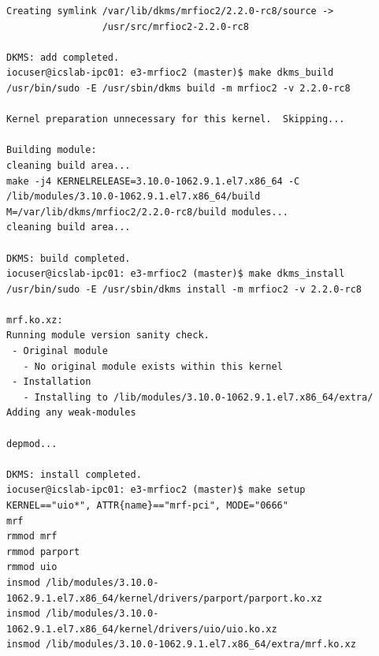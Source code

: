 \documentclass[11pt
  , a4paper
  , article
  , oneside
  , showtrims
]{memoir}
\begin{document}
{\begin{itemize}
\begin{lstlisting}[style=termstyle]
Creating symlink /var/lib/dkms/mrfioc2/2.2.0-rc8/source ->
                 /usr/src/mrfioc2-2.2.0-rc8

DKMS: add completed.
iocuser@icslab-ipc01: e3-mrfioc2 (master)$ make dkms_build
/usr/bin/sudo -E /usr/sbin/dkms build -m mrfioc2 -v 2.2.0-rc8

Kernel preparation unnecessary for this kernel.  Skipping...

Building module:
cleaning build area...
make -j4 KERNELRELEASE=3.10.0-1062.9.1.el7.x86_64 -C /lib/modules/3.10.0-1062.9.1.el7.x86_64/build M=/var/lib/dkms/mrfioc2/2.2.0-rc8/build modules...
cleaning build area...

DKMS: build completed.
iocuser@icslab-ipc01: e3-mrfioc2 (master)$ make dkms_install
/usr/bin/sudo -E /usr/sbin/dkms install -m mrfioc2 -v 2.2.0-rc8

mrf.ko.xz:
Running module version sanity check.
 - Original module
   - No original module exists within this kernel
 - Installation
   - Installing to /lib/modules/3.10.0-1062.9.1.el7.x86_64/extra/
Adding any weak-modules

depmod...

DKMS: install completed.
iocuser@icslab-ipc01: e3-mrfioc2 (master)$ make setup
KERNEL=="uio*", ATTR{name}=="mrf-pci", MODE="0666"
mrf
rmmod mrf
rmmod parport
rmmod uio
insmod /lib/modules/3.10.0-1062.9.1.el7.x86_64/kernel/drivers/parport/parport.ko.xz
insmod /lib/modules/3.10.0-1062.9.1.el7.x86_64/kernel/drivers/uio/uio.ko.xz
insmod /lib/modules/3.10.0-1062.9.1.el7.x86_64/extra/mrf.ko.xz



\end{lstlisting}
\end{itemize}}
\end{document}

